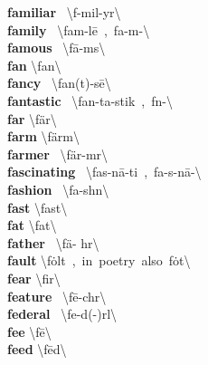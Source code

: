 \documentclass[10pt,a4paper]{article}
\begin{document}
\begin{multicols}{2}
\textbf{ familiar }\quad \ \textbackslash f\textschwa -\textprimstress mil-y\textschwa r\textbackslash \\
\textbf{ family }\quad \ \textbackslash \textprimstress fam-l\={e}\ ,\ \textprimstress fa-m\textschwa -\textbackslash \\
\textbf{ famous }\quad \ \textbackslash \textprimstress f\={a}-m\textschwa s\textbackslash \\
\textbf{ fan }\quad \textbackslash \textprimstress fan\textbackslash \\
\textbf{ fancy }\quad \ \textbackslash \textprimstress fan(t)-s\={e}\textbackslash \\
\textbf{ fantastic }\quad \ \textbackslash fan-\textprimstress ta-stik\ ,\ f\textschwa n-\textbackslash \\
\textbf{ far }\quad \textbackslash \textprimstress f\"{a}r\textbackslash \\
\textbf{ farm }\quad \textbackslash \textprimstress f\"{a}rm\textbackslash \\
\textbf{ farmer }\quad \ \textbackslash \textprimstress f\"{a}r-m\textschwa r\textbackslash \\
\textbf{ fascinating }\quad \ \textbackslash \textprimstress fas-\textsecstress n\={a}-ti\engma \ ,\ \textprimstress fa-s\textschwa -\textsecstress n\={a}-\textbackslash \\
\textbf{ fashion }\quad \ \textbackslash \textprimstress fa-sh\textschwa n\textbackslash \\
\textbf{ fast }\quad \textbackslash \textprimstress fast\textbackslash \\
\textbf{ fat }\quad \textbackslash \textprimstress fat\textbackslash \\
\textbf{ father }\quad \ \textbackslash \textprimstress f\"{a}- h\textschwa r\textbackslash \\
\textbf{ fault }\quad \textbackslash \textprimstress f\.{o}lt\ ,\ in\ poetry\ also\ \textprimstress f\.{o}t\textbackslash \\
\textbf{ fear }\quad \textbackslash \textprimstress fir\textbackslash \\
\textbf{ feature }\quad \ \textbackslash \textprimstress f\={e}-ch\textschwa r\textbackslash \\
\textbf{ federal }\quad \ \textbackslash \textprimstress fe-d(\textschwa -)r\textschwa l\textbackslash \\
\textbf{ fee }\quad \textbackslash \textprimstress f\={e}\textbackslash \\
\textbf{ feed }\quad \textbackslash \textprimstress f\={e}d\textbackslash \\

\end{multicols}
\end{document}
